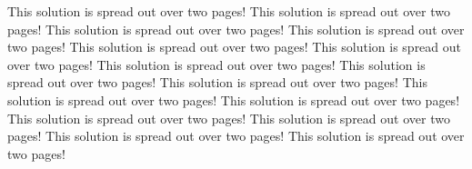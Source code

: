 \begin{solution}
	This solution is spread out over two pages!
	This solution is spread out over two pages!
	This solution is spread out over two pages!
	This solution is spread out over two pages!
	This solution is spread out over two pages!
	This solution is spread out over two pages!
	This solution is spread out over two pages!
	This solution is spread out over two pages!
	This solution is spread out over two pages!
	This solution is spread out over two pages!
	This solution is spread out over two pages!
	This solution is spread out over two pages!
	This solution is spread out over two pages!
	This solution is spread out over two pages!
	This solution is spread out over two pages!
\end{solution}
